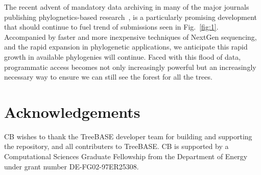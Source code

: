 \documentclass[authoryear, preprint]{elsarticle}
\newenvironment{knitrout}{}{} %
\begin{document}
The recent advent of mandatory data archiving in many of the major journals publishing phylognetics-based research~\citep[\emph{e.g.}][]{Fairbairn2010, Piwowar2011, Whitlock2010}, is a particularly promising development that should continue to fuel trend of submissions seen in Fig.~\ref{fig:1}.  Accompanied by faster and more inexpensive techniques of NextGen sequencing, and the rapid expansion in phylogenetic applications, we anticipate this rapid growth in available phylogenies will continue.  Faced with this flood of data, programmatic access becomes not only increasingly powerful but an increasingly necessary way to ensure we can still see the forest for all the trees.   

 \section{Acknowledgements}
 CB wishes to thank the TreeBASE developer team for building and supporting the repository, and all contributers to TreeBASE.
 CB is supported by a Computational Sciences Graduate Fellowship from the Department of Energy under grant number DE-FG02-97ER25308.   
 \section*{ }%
% 
  
\begin{knitrout}
\color{fgcolor}
\end{knitrout}
\end{document}
